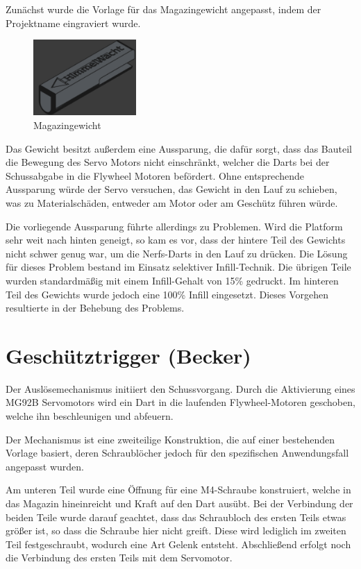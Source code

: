 Zunächst wurde die Vorlage \cite{cad_turret_blueprint} für das Magazingewicht angepasst, indem der Projektname eingraviert wurde.

\begin{figure}[ht]
    \centering
    \includegraphics[width=0.35\textwidth, keepaspectratio]{images/cad_becker_weight.png}
    \caption{Magazingewicht}
\end{figure}

Das Gewicht besitzt außerdem eine Aussparung, die dafür sorgt, dass das Bauteil die Bewegung des Servo Motors nicht einschränkt, welcher die Darts bei der Schussabgabe in die Flywheel Motoren befördert. 
Ohne entsprechende Aussparung würde der Servo versuchen, das Gewicht in den Lauf zu schieben, was zu Materialschäden, entweder am Motor oder am Geschütz führen würde.

Die vorliegende Aussparung führte allerdings zu Problemen. Wird die Platform sehr weit nach hinten geneigt, so kam es vor, dass der hintere Teil des Gewichts nicht schwer genug war, um die Nerfs-Darts in den Lauf zu drücken.
Die Lösung für dieses Problem bestand im Einsatz selektiver Infill-Technik. Die übrigen Teile wurden standardmäßig mit einem Infill-Gehalt von 15\% gedruckt.
Im hinteren Teil des Gewichts wurde jedoch eine 100\% Infill eingesetzt. Dieses Vorgehen resultierte in der Behebung des Problems.

\section{Geschütztrigger (Becker)}

Der Auslösemechanismus initiiert den Schussvorgang. Durch die Aktivierung eines MG92B Servomotors wird ein Dart in die laufenden Flywheel-Motoren geschoben, welche ihn
beschleunigen und abfeuern.

Der Mechanismus ist eine zweiteilige Konstruktion, die auf einer bestehenden Vorlage \cite{cad_turret_blueprint} basiert, deren Schraublöcher jedoch für
den spezifischen Anwendungsfall angepasst wurden.

Am unteren Teil wurde eine Öffnung für eine M4-Schraube konstruiert, welche in das Magazin hineinreicht und Kraft auf den Dart ausübt. 
Bei der Verbindung der beiden Teile wurde darauf geachtet, dass das Schraubloch des ersten Teils etwas größer ist, so dass die Schraube hier nicht greift. 
Diese wird lediglich im zweiten Teil festgeschraubt, wodurch eine Art Gelenk entsteht.
Abschließend erfolgt noch die Verbindung des ersten Teils mit dem Servomotor.

